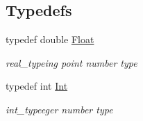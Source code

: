 \subsection*{Typedefs}
\begin{DoxyCompactItemize}
\item 
\mbox{\label{namespaceacme_aebc1796778ad2c2ef830090c5738e56c}} 
typedef double \hyperlink{namespaceacme_aebc1796778ad2c2ef830090c5738e56c}{Float}
\begin{DoxyCompactList}\small\item\em real\+\_\+typeing point number type \end{DoxyCompactList}\item 
\mbox{\label{namespaceacme_a2ad7da80dca2640a79a37d38e2b14eb8}} 
typedef int \hyperlink{namespaceacme_a2ad7da80dca2640a79a37d38e2b14eb8}{Int}
\begin{DoxyCompactList}\small\item\em int\+\_\+typeeger number type \end{DoxyCompactList}\end{DoxyCompactItemize}
